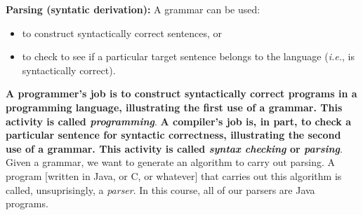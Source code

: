\begin{minipage}[t]{\sw}
\slidenumber
\LARGE
{\bf Parsing (syntatic derivation):}\exx
\emm{\Large\LightBox{\MYlon}}\exx
A grammar can be used:
\begin{itemize}
\itemsep 0ex
\item
  to construct syntactically correct sentences, or
\item
  to check to see if a particular target sentence belongs
  to the language ({\em i.e.}, is syntactically correct).
\end{itemize}
{\bf A programmer's job is to construct syntactically correct programs
in a programming language, illustrating the first use of a grammar.
This activity is called {\em programming}}.\exx
{\bf A compiler's job is, in part,
to check a particular sentence for syntactic correctness,
illustrating the second use of a grammar.
This activity is called {\em syntax checking} or {\em parsing}}.\exx
Given a grammar,
we want to generate an algorithm to carry out parsing.
A program [written in Java, or C, or whatever]
that carries out this algorithm is called,
unsuprisingly, a {\em parser}.
In this course, all of our parsers are Java programs.
\end{minipage}
\clearpage
